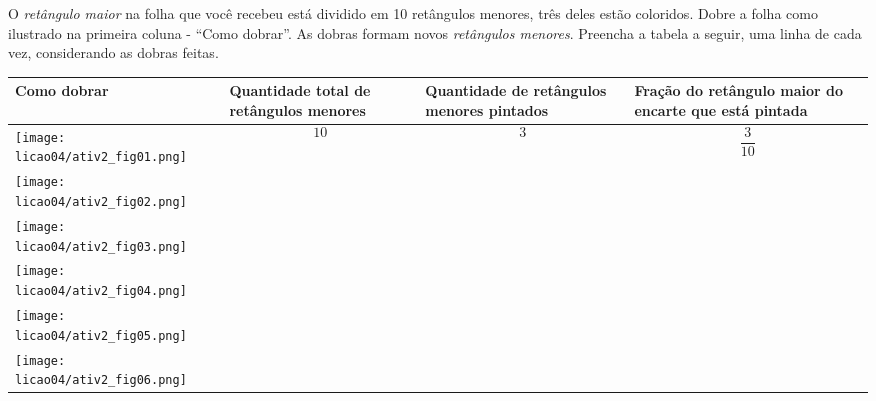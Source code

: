 \begin{atividade}[label=chap4-ativ2]{}

O \textit{retângulo maior} na folha que você recebeu está dividido em 10 retângulos menores, três deles estão coloridos. Dobre a folha como ilustrado na primeira coluna - ``Como dobrar''. As dobras formam novos \textit{retângulos menores}. Preencha a tabela a seguir, uma linha de cada vez, considerando as dobras feitas.
\clearpage

 \begin{longtable}{|m{}|m{}|m{}|m{}|}
    \hline
      Como dobrar  &  Quantidade total de retângulos menores & Quantidade de retângulos menores pintados  &   Fração do retângulo maior do encarte que está pintada  \\
    \hline \hline
    \endhead
    \texttt{[image: licao04/ativ2\_fig01.png]}      & $$10$$ & $$3$$&  $$\dfrac{3}{10}$$   \\
    \hline
     \texttt{[image: licao04/ativ2\_fig02.png]}                                                                              & &  &  \\
    \hline
     \texttt{[image: licao04/ativ2\_fig03.png]}     &  &   &  \\
    \hline
     \texttt{[image: licao04/ativ2\_fig04.png]} & &&\\
    \hline
     \texttt{[image: licao04/ativ2\_fig05.png]}  &                                     &                                  &                                                   \\
    \hline
     \texttt{[image: licao04/ativ2\_fig06.png]} &                                     &                                  &                                                   \\
    \hline
  \end{longtable}
\end{atividade}
\clearpage

